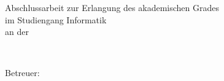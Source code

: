 \begin{titlepage}
	\vspace{2em}
	\begin{center}
	\ifdefined\graduation%
	\if\graduation\empty%
	\else%
	\textsf{Abschlussarbeit zur Erlangung des akademischen Grades}\\[0.5cm]
	\textsf{\graduation} \textsf{im Studiengang Informatik}\\[0.5cm]
	\textsf{an der \institution}\\[0.5cm]
	\textsf{\subinstitution}
	\fi
	\end{center}
	
	\vspace*{\fill}

 	\enlargethispage{1\baselineskip}
	\hrulefill\\
	\begin{center}
		\textsf{Betreuer: \\  \supervisor}
	\end{center}
	
	\vspace*{\fill}
	
	
	\enlargethispage{4\baselineskip}
	\begin{minipage}[b]{0mm}
	\end{minipage}
	
	
\end{titlepage}
